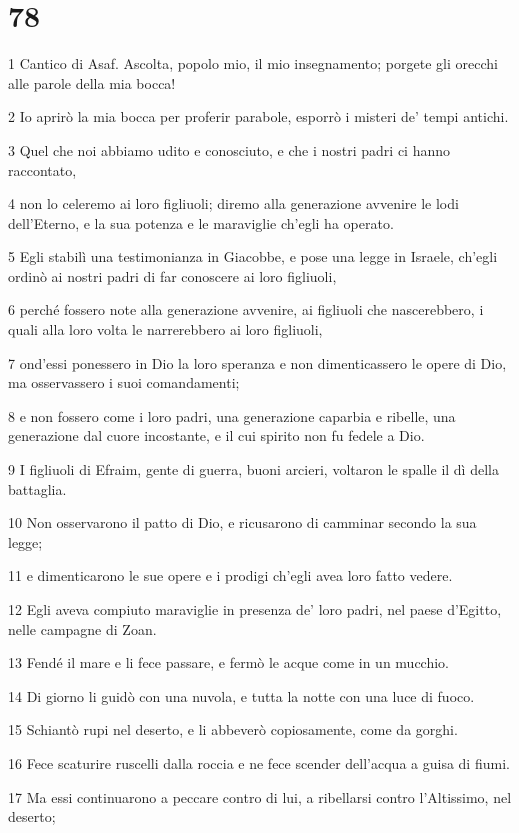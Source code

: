 \chapter{78}

\par 1 Cantico di Asaf. Ascolta, popolo mio, il mio insegnamento; porgete gli orecchi alle parole della mia bocca!
\par 2 Io aprirò la mia bocca per proferir parabole, esporrò i misteri de' tempi antichi.
\par 3 Quel che noi abbiamo udito e conosciuto, e che i nostri padri ci hanno raccontato,
\par 4 non lo celeremo ai loro figliuoli; diremo alla generazione avvenire le lodi dell'Eterno, e la sua potenza e le maraviglie ch'egli ha operato.
\par 5 Egli stabilì una testimonianza in Giacobbe, e pose una legge in Israele, ch'egli ordinò ai nostri padri di far conoscere ai loro figliuoli,
\par 6 perché fossero note alla generazione avvenire, ai figliuoli che nascerebbero, i quali alla loro volta le narrerebbero ai loro figliuoli,
\par 7 ond'essi ponessero in Dio la loro speranza e non dimenticassero le opere di Dio, ma osservassero i suoi comandamenti;
\par 8 e non fossero come i loro padri, una generazione caparbia e ribelle, una generazione dal cuore incostante, e il cui spirito non fu fedele a Dio.
\par 9 I figliuoli di Efraim, gente di guerra, buoni arcieri, voltaron le spalle il dì della battaglia.
\par 10 Non osservarono il patto di Dio, e ricusarono di camminar secondo la sua legge;
\par 11 e dimenticarono le sue opere e i prodigi ch'egli avea loro fatto vedere.
\par 12 Egli aveva compiuto maraviglie in presenza de' loro padri, nel paese d'Egitto, nelle campagne di Zoan.
\par 13 Fendé il mare e li fece passare, e fermò le acque come in un mucchio.
\par 14 Di giorno li guidò con una nuvola, e tutta la notte con una luce di fuoco.
\par 15 Schiantò rupi nel deserto, e li abbeverò copiosamente, come da gorghi.
\par 16 Fece scaturire ruscelli dalla roccia e ne fece scender dell'acqua a guisa di fiumi.
\par 17 Ma essi continuarono a peccare contro di lui, a ribellarsi contro l'Altissimo, nel deserto;
